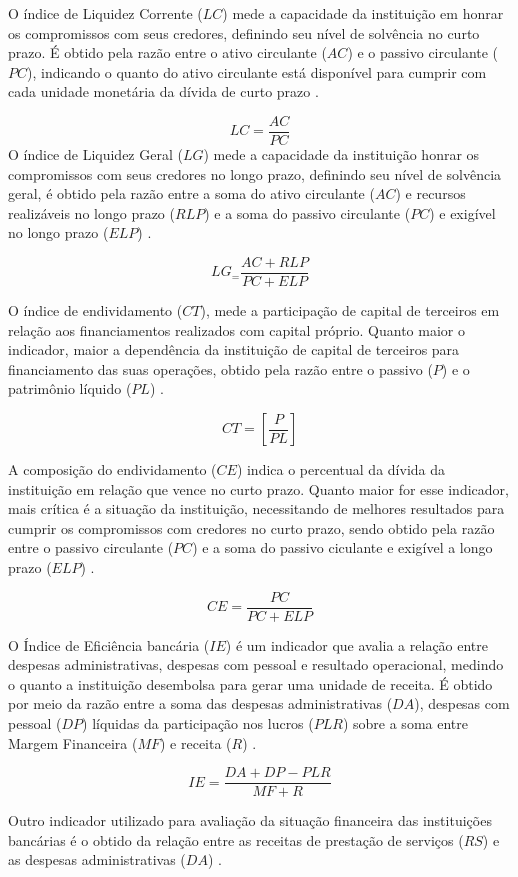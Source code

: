 \documentclass[12pt,openright,oneside,a4paper,chapter=TITLE,section=TITLE,subsection=TITLE,english,french,spanish,portugues,sumario=tradicional]{abntex2}
\begin{document}
O índice de Liquidez Corrente (\(LC\)) mede a capacidade da instituição em honrar os compromissos com seus credores, definindo seu nível de solvência no curto prazo. É obtido pela razão entre o ativo circulante (\(AC\)) e o passivo circulante (\(PC\)), indicando o quanto do ativo circulante está disponível para cumprir com cada unidade monetária da dívida de curto prazo \cite{graham:2012} \cite{assaf:2020}.

\[
LC = \frac{AC}{PC}
\]
O índice de Liquidez Geral (\(LG\)) mede a capacidade da instituição honrar os compromissos com seus credores no longo prazo, definindo seu nível de solvência geral, é obtido pela razão entre a soma do ativo circulante (\(AC\)) e recursos realizáveis no longo prazo (\(RLP\)) e a soma do passivo circulante (\(PC\)) e exigível no longo prazo (\(ELP\)) \cite{assaf:2020}.

\[
LG_ = \frac{AC + RLP}{PC + ELP}
\]

O índice de endividamento (\(CT\)), mede a participação de capital de terceiros em relação aos financiamentos realizados com capital próprio. Quanto maior o indicador, maior a dependência da instituição de capital de terceiros para financiamento das suas operações, obtido pela razão entre o passivo (\(P\)) e o patrimônio líquido (\(PL\)) \cite{assaf:2020}.

\[
CT = [\frac{P}{PL}]
\]

A composição do endividamento (\(CE\)) indica o percentual da dívida da instituição em relação que vence no curto prazo. Quanto maior for esse indicador, mais crítica é a situação da instituição, necessitando de melhores resultados para cumprir os compromissos com credores no curto prazo, sendo obtido pela razão entre o passivo circulante (\(PC\)) e a soma do passivo ciculante e exigível a longo prazo (\(ELP\)) \cite{assaf:2020}.

\[
CE = \frac{PC}{PC + ELP}
\]

O Índice de Eficiência bancária (\(IE\)) é um indicador que avalia a relação entre despesas administrativas, despesas com pessoal e resultado operacional, medindo o quanto a instituição desembolsa para gerar uma unidade de receita. É obtido por meio da razão entre a soma das despesas administrativas (\(DA\)), despesas com pessoal (\(DP\)) líquidas da participação nos lucros (\(PLR\)) sobre a soma entre Margem Financeira (\(MF\)) e receita (\(R\)) \cite{timotio:2018}.

\[
IE = \frac{DA + DP - PLR}{MF + R} 
\]

Outro indicador utilizado para avaliação da situação financeira das instituições bancárias é o obtido da relação entre as receitas de prestação de serviços (\(RS\)) e as despesas administrativas (\(DA\)) \cite{dantas:2012}.
\end{document}
